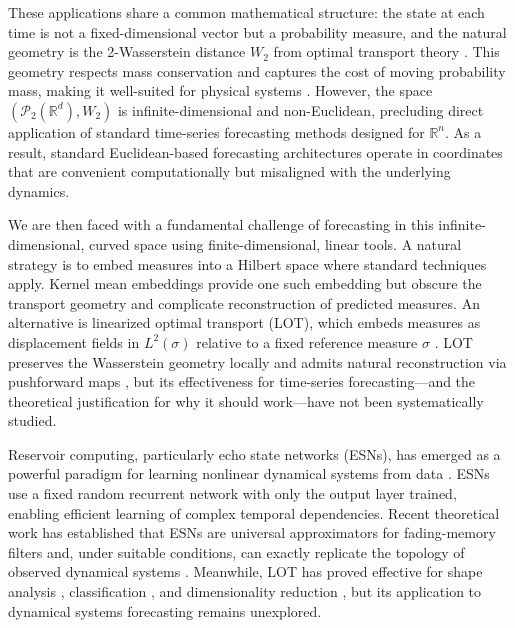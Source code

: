 \documentclass[11pt]{article}
\newcommand{\1}{\mathbf{1}}
\begin{document}
These applications share a common mathematical structure: the state at each time is not a fixed-dimensional vector but a probability measure, and the natural geometry is the 2-Wasserstein distance $W_2$ from optimal transport theory \cite{villani2008optimal,ambrosio2008gradient}. This geometry respects mass conservation and captures the cost of moving probability mass, making it well-suited for physical systems \cite{PC19}. However, the space $(\mathcal{P}_2(\mathbb{R}^d), W_2)$ is infinite-dimensional and non-Euclidean, precluding direct application of standard time-series forecasting methods designed for $\mathbb{R}^n$. As a result, standard Euclidean-based forecasting architectures operate in coordinates that are convenient computationally but misaligned with the underlying dynamics.

We are then faced with a fundamental challenge of forecasting in this infinite-dimensional, curved space using finite-dimensional, linear tools. A natural strategy is to embed measures into a Hilbert space where standard techniques apply. Kernel mean embeddings provide one such embedding but obscure the transport geometry and complicate reconstruction of predicted measures. An alternative is linearized optimal transport (LOT), which embeds measures as displacement fields in $L^2(\sigma)$ relative to a fixed reference measure $\sigma$ \cite{wei13,kolouri2017optimal}. LOT preserves the Wasserstein geometry locally and admits natural reconstruction via pushforward maps \cite{moosmueller20, ambrosio2008gradient}, but its effectiveness for time-series forecasting---and the theoretical justification for why it should work---have not been systematically studied.

Reservoir computing, particularly echo state networks (ESNs), has emerged as a powerful paradigm for learning nonlinear dynamical systems from data \cite{jaeger2001echo}. ESNs use a fixed random recurrent network with only the output layer trained, enabling efficient learning of complex temporal dependencies. Recent theoretical work has established that ESNs are universal approximators for fading-memory filters and, under suitable conditions, can exactly replicate the topology of observed dynamical systems \cite{Hart_2020}. Meanwhile, LOT has proved effective for shape analysis \cite{wei13}, classification \cite{moosmuller2020linear, khurana2022supervised, aldroubi2021partitioning}, and dimensionality reduction \cite{cloninger2023lotwassmap}, but its application to dynamical systems forecasting remains unexplored. 
\end{document}
